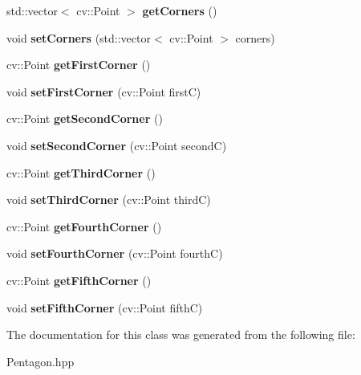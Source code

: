 \begin{DoxyCompactItemize}
\item 
\mbox{\label{class_pentagon_ab38482973f796da34cd9ac62cefb1491}} 
std\+::vector$<$ cv\+::\+Point $>$ {\bfseries get\+Corners} ()
\item 
\mbox{\label{class_pentagon_a42c8df4cbb1fcf985c96c9886a21c70a}} 
void {\bfseries set\+Corners} (std\+::vector$<$ cv\+::\+Point $>$ corners)
\item 
\mbox{\label{class_pentagon_addd350e1488aa195eb3c91adb76e64e0}} 
cv\+::\+Point {\bfseries get\+First\+Corner} ()
\item 
\mbox{\label{class_pentagon_a1f29f58f3aacf4fc593256748e8b2841}} 
void {\bfseries set\+First\+Corner} (cv\+::\+Point firstC)
\item 
\mbox{\label{class_pentagon_add721a9408cff57885481111f8a0e690}} 
cv\+::\+Point {\bfseries get\+Second\+Corner} ()
\item 
\mbox{\label{class_pentagon_a42623c731798365417e921ae8e6217bd}} 
void {\bfseries set\+Second\+Corner} (cv\+::\+Point secondC)
\item 
\mbox{\label{class_pentagon_a7de3d4c5946cc3cfb9641a4eef7f1ca8}} 
cv\+::\+Point {\bfseries get\+Third\+Corner} ()
\item 
\mbox{\label{class_pentagon_aa1c2be53f8342eaf50fdeb68493fab9a}} 
void {\bfseries set\+Third\+Corner} (cv\+::\+Point thirdC)
\item 
\mbox{\label{class_pentagon_a6d673278dc4cc85071a4ce59bc909920}} 
cv\+::\+Point {\bfseries get\+Fourth\+Corner} ()
\item 
\mbox{\label{class_pentagon_ace27ab200ac78bac2829c2d937c564ae}} 
void {\bfseries set\+Fourth\+Corner} (cv\+::\+Point fourthC)
\item 
\mbox{\label{class_pentagon_a14b93b3732e5c59d1b6b45b379093a2c}} 
cv\+::\+Point {\bfseries get\+Fifth\+Corner} ()
\item 
\mbox{\label{class_pentagon_a3311d48354b44e57d290937b975ae95e}} 
void {\bfseries set\+Fifth\+Corner} (cv\+::\+Point fifthC)
\end{DoxyCompactItemize}


The documentation for this class was generated from the following file\+:\begin{DoxyCompactItemize}
\item 
Pentagon.\+hpp\end{DoxyCompactItemize}
